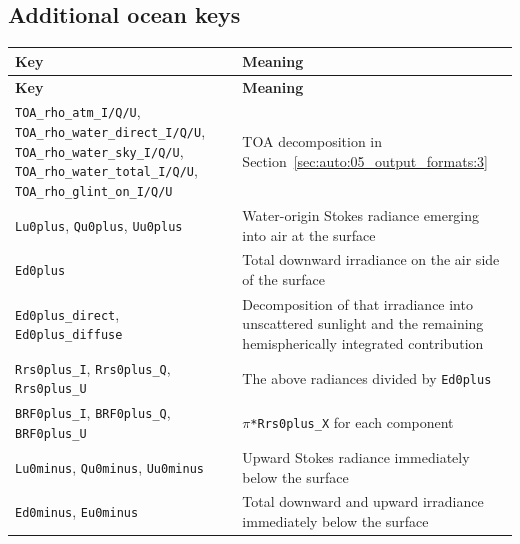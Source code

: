 \subsection{Additional ocean keys}
\label{sec:auto:05_output_formats:4.3}

{\TableFont
\begin{longtable}{@{}>{\raggedright\arraybackslash}p{}>{\raggedright\arraybackslash}p{}@{}}
\toprule
\textbf{Key} & \textbf{Meaning} \\
\midrule
\endfirsthead
\toprule
\textbf{Key} & \textbf{Meaning} \\
\midrule
\endhead
\bottomrule
\endfoot
\texttt{TOA\_\allowbreak{}rho\_\allowbreak{}atm\_\allowbreak{}I/\allowbreak{}Q/\allowbreak{}U}, \texttt{TOA\_\allowbreak{}rho\_\allowbreak{}water\_\allowbreak{}direct\_\allowbreak{}I/\allowbreak{}Q/\allowbreak{}U}, \texttt{TOA\_\allowbreak{}rho\_\allowbreak{}water\_\allowbreak{}sky\_\allowbreak{}I/\allowbreak{}Q/\allowbreak{}U}, \texttt{TOA\_\allowbreak{}rho\_\allowbreak{}water\_\allowbreak{}total\_\allowbreak{}I/\allowbreak{}Q/\allowbreak{}U}, \texttt{TOA\_\allowbreak{}rho\_\allowbreak{}glint\_\allowbreak{}on\_\allowbreak{}I/\allowbreak{}Q/\allowbreak{}U} & TOA decomposition in Section~\ref{sec:auto:05_output_formats:3} \\
\texttt{Lu0plus}, \texttt{Qu0plus}, \texttt{Uu0plus} & Water-origin Stokes radiance emerging into air at the surface \\
\texttt{Ed0plus} & Total downward irradiance on the air side of the surface \\
\texttt{Ed0plus\_\allowbreak{}direct}, \texttt{Ed0plus\_\allowbreak{}diffuse} & Decomposition of that irradiance into unscattered sunlight and the remaining hemispherically integrated contribution \\
\texttt{Rrs0plus\_\allowbreak{}I}, \texttt{Rrs0plus\_\allowbreak{}Q}, \texttt{Rrs0plus\_\allowbreak{}U} & The above radiances divided by \texttt{Ed0plus} \\
\texttt{BRF0plus\_\allowbreak{}I}, \texttt{BRF0plus\_\allowbreak{}Q}, \texttt{BRF0plus\_\allowbreak{}U} & \texttt{\ensuremath{\pi}*Rrs0plus\_\allowbreak{}X} for each component \\
\texttt{Lu0minus}, \texttt{Qu0minus}, \texttt{Uu0minus} & Upward Stokes radiance immediately below the surface \\
\texttt{Ed0minus}, \texttt{Eu0minus} & Total downward and upward irradiance immediately below the surface \\

\end{longtable}}
